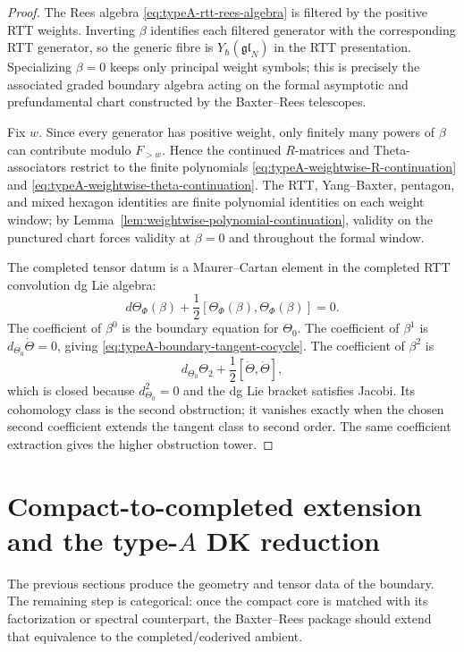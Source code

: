 \begin{proof}
The Rees algebra \eqref{eq:typeA-rtt-rees-algebra} is filtered by the
positive RTT weights. Inverting $\beta$ identifies each filtered
generator with the corresponding RTT generator, so the generic fibre is
$Y_\hbar(\mathfrak{gl}_N)$ in the RTT presentation. Specializing
$\beta=0$ keeps only principal weight symbols; this is precisely the
associated graded boundary algebra acting on the formal asymptotic and
prefundamental chart constructed by the Baxter--Rees telescopes.

Fix $w$. Since every generator has positive weight, only finitely many
powers of $\beta$ can contribute modulo $F_{>w}$. Hence the continued
$R$-matrices and Theta-associators restrict to the finite polynomials
\eqref{eq:typeA-weightwise-R-continuation} and
\eqref{eq:typeA-weightwise-theta-continuation}. The RTT, Yang--Baxter,
pentagon, and mixed hexagon identities are finite polynomial identities
on each weight window; by
Lemma~\ref{lem:weightwise-polynomial-continuation}, validity on the
punctured chart forces validity at $\beta=0$ and throughout the formal
window.

The completed tensor datum is a Maurer--Cartan element in the completed
RTT convolution dg Lie algebra:
\begin{equation}
d\Theta_{\Phi}(\beta)+\frac12[\Theta_{\Phi}(\beta),\Theta_{\Phi}(\beta)]
=0.
\end{equation}
The coefficient of $\beta^0$ is the boundary equation for $\Theta_0$.
The coefficient of $\beta^1$ is
$d_{\Theta_0}\dot\Theta=0$, giving
\eqref{eq:typeA-boundary-tangent-cocycle}. The coefficient of
$\beta^2$ is
\begin{equation}
d_{\Theta_0}\Theta_2+\frac12[\dot\Theta,\dot\Theta],
\end{equation}
which is closed because $d_{\Theta_0}^2=0$ and the dg Lie bracket
satisfies Jacobi. Its cohomology class is the second obstruction; it
vanishes exactly when the chosen second coefficient extends the tangent
class to second order. The same coefficient extraction gives the higher
obstruction tower.
\end{proof}

\section{Compact-to-completed extension and the type-$A$ DK reduction}
\label{sec:typeA-DK-reduction}

The previous sections produce the geometry and tensor data of the
boundary. The remaining step is categorical: once the compact core is
matched with its factorization or spectral counterpart, the Baxter--Rees
package should extend that equivalence to the completed/coderived ambient.

